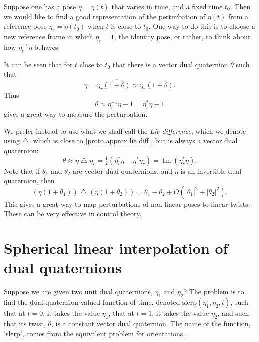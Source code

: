 \documentclass[reqno,12pt]{amsart}
\DeclareMathOperator\imagpart{Im}
\newcommand{\liediff}{\mathbin{\triangle}}
\begin{document}
Suppose one has a pose $\eta = \eta(t)$ that varies in time, and a fixed time $t_0$.  Then we would like to find a good representation of the perturbation of $\eta(t)$ from a reference pose $\eta_r = \eta(t_0)$ when $t$ is close to $t_0$.  One way to do this is to choose a new reference frame in which $\eta_r = 1$, the identity pose, or rather, to think about how $\eta_r ^{-1} \eta$ behaves.

It can be seen that for $t$ close to $t_0$ that there is a vector dual quaternion $\theta$ such that
\begin{equation}
\eta = \eta_r \widehat{(1 + \theta)} \approx \eta_r (1 + \theta) .
\end{equation}
Thus
\begin{equation}
\label{proto approx lie diff}
\theta \approx \eta_r^{-1} \eta - 1 = \eta_r^* \eta - 1
\end{equation}
gives a great way to measure the perturbation.

We prefer instead to use what we shall call the \emph{Lie difference}, which we denote using $\liediff$, which is close to \eqref{proto approx lie diff}, but is always a vector dual quaternion:
\begin{equation}
\theta \approx \eta\liediff\eta_r = \tfrac12 (\eta_r^* \eta - \eta^* \eta_r) = \imagpart(\eta_r^* \eta).
\end{equation}
Note that if $\theta_1$ and $\theta_2$ are vector dual quaternions, and $\eta$ is an invertible dual quaternion, then
\begin{equation}
\label{approx approx lie diff}
(\eta(1+\theta_1)) \liediff (\eta(1+\theta_2)) = \theta_1 - \theta_2 + O(|\theta_1|^2 + |\theta_2|^2) .
\end{equation}
This gives a great way to map perturbations of non-linear poses to linear twists.  These can be very effective in control theory.

\section{Spherical linear interpolation of dual quaternions}
\label{sec fun dq}

Suppose we are given two unit dual quaternions, $\eta_1$ and $\eta_2$?  The problem is to find the dual quaternion valued function of time, denoted $\text{slerp}(\eta_1, \eta_2, t)$, such that at $t = 0$, it takes the value $\eta_1$, that at $t = 1$, it takes the value $\eta_2$, and such that its twist, $\theta$, is a constant vector dual quaternion.  The name of the function, `slerp', comes from the equivalent problem for orientations \cite{shoemake}.
\end{document}
